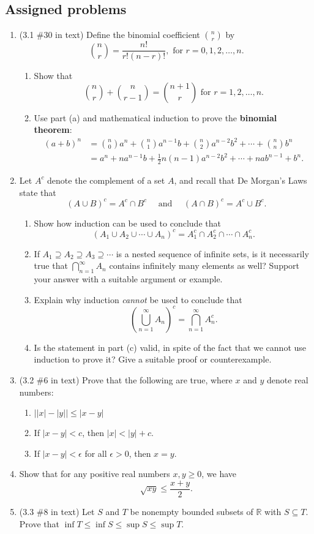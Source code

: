 \documentclass[letterpaper,12pt]{article}
\newcommand{\abs}[1]{\lvert #1\rvert}
\begin{document}
\subsection*{Assigned problems}
\begin{enumerate}
 \item (3.1 \#30 in text) Define the binomial coefficient $\binom{n}{r}$ by
\[
 \binom{n}{r} = \frac{n!}{r!(n-r)!}, \text{ for } r = 0, 1, 2, \ldots, n.
\]
\begin{enumerate}
  \item Show that
\[
 \binom{n}{r}+\binom{n}{r-1} = \binom{n+1}{r} \text{ for } r=1,2,\ldots, n.
\]
  \item Use part (a) and mathematical induction to prove the {\bf binomial theorem}:
\begin{align*}
 (a+b)^n & = \binom{n}{0}a^n + \binom{n}{1}a^{n-1}b+\binom{n}{2}a^{n-2}b^2+\cdots + \binom{n}{n}b^n\\
& = a^n +na^{n-1}b+\frac{1}{2}n(n-1)a^{n-2}b^2+\cdots+nab^{n-1}+b^n.
\end{align*}
\end{enumerate}
 \item Let $A^c$ denote the complement of a set $A$, and recall that De Morgan's Laws state that
\[
 (A\cup B)^c = A^c\cap B^c \quad \text{ and } \quad (A\cap B)^c = A^c\cup B^c.
\]
\begin{enumerate}
 \item Show how induction can be used to conclude that
\[
 (A_1\cup A_2\cup\cdots \cup A_n)^c = A_1^c\cap A_2^c\cap\cdots\cap A_n^c.
\]
 \item If $A_1\supseteq A_2\supseteq A_3\supseteq\cdots$ is a nested sequence of infinite sets, is it necessarily true that $\bigcap_{n=1}^\infty A_n$ contains infinitely many elements as well? Support your answer with a suitable argument or example.
 \item Explain why induction {\em cannot} be used to conclude that
\[
 \left(\bigcup_{n=1}^\infty A_n\right)^c = \bigcap_{n=1}^\infty A_n^c.
\]
 \item Is the statement in part (c) valid, in spite of the fact that we cannot use induction to prove it? Give a suitable proof or counterexample.
\end{enumerate}

 \item (3.2 \#6 in text) Prove that the following are true, where $x$ and $y$ denote real numbers:
\begin{enumerate}
  \item $\abs{\abs{x}-\abs{y}}\leq \abs{x-y}$
  \item If $\abs{x-y}<c$, then $\abs{x}<\abs{y}+c$.
  \item If $\abs{x-y}<\epsilon$ for all $\epsilon>0$, then $x=y$.
\end{enumerate}
 \item Show that for any positive real numbers $x,y\geq 0$, we have
\[
 \sqrt{xy}\leq \frac{x+y}{2}.
\]
 \item (3.3 \#8 in text) Let $S$ and $T$ be nonempty bounded subsets of $\mathbb{R}$ with $S\subseteq T$. Prove that $\inf T\leq \inf S\leq \sup S\leq \sup T$.
\end{enumerate}
\end{document}
